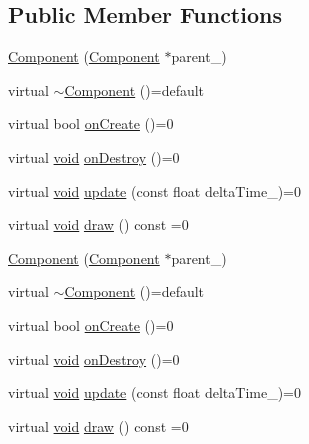 \subsection*{Public Member Functions}
\begin{DoxyCompactItemize}
\item 
\hyperlink{classComponent_ad8fd006e351b2722c2e0f79010170a3c}{Component} (\hyperlink{classComponent}{Component} $\ast$parent\+\_\+)
\item 
virtual \hyperlink{classComponent_ad82d7393e339c1b19cc17a0d55b5674d}{$\sim$\+Component} ()=default
\item 
virtual bool \hyperlink{classComponent_a3a1537a8b8bcdb2155afbb925c77b0a2}{on\+Create} ()=0
\item 
virtual \hyperlink{imgui__impl__opengl3__loader_8h_ac668e7cffd9e2e9cfee428b9b2f34fa7}{void} \hyperlink{classComponent_a2b198f27162a6caf63917e304295f892}{on\+Destroy} ()=0
\item 
virtual \hyperlink{imgui__impl__opengl3__loader_8h_ac668e7cffd9e2e9cfee428b9b2f34fa7}{void} \hyperlink{classComponent_a3448977e6f464df89e77dda7c6f52204}{update} (const float delta\+Time\+\_\+)=0
\item 
virtual \hyperlink{imgui__impl__opengl3__loader_8h_ac668e7cffd9e2e9cfee428b9b2f34fa7}{void} \hyperlink{classComponent_a8f45309003f02191f2bcc8864e8e9ecf}{draw} () const =0
\item 
\hyperlink{classComponent_ad8fd006e351b2722c2e0f79010170a3c}{Component} (\hyperlink{classComponent}{Component} $\ast$parent\+\_\+)
\item 
virtual \hyperlink{classComponent_ad82d7393e339c1b19cc17a0d55b5674d}{$\sim$\+Component} ()=default
\item 
virtual bool \hyperlink{classComponent_a3a1537a8b8bcdb2155afbb925c77b0a2}{on\+Create} ()=0
\item 
virtual \hyperlink{imgui__impl__opengl3__loader_8h_ac668e7cffd9e2e9cfee428b9b2f34fa7}{void} \hyperlink{classComponent_a2b198f27162a6caf63917e304295f892}{on\+Destroy} ()=0
\item 
virtual \hyperlink{imgui__impl__opengl3__loader_8h_ac668e7cffd9e2e9cfee428b9b2f34fa7}{void} \hyperlink{classComponent_a3448977e6f464df89e77dda7c6f52204}{update} (const float delta\+Time\+\_\+)=0
\item 
virtual \hyperlink{imgui__impl__opengl3__loader_8h_ac668e7cffd9e2e9cfee428b9b2f34fa7}{void} \hyperlink{classComponent_a8f45309003f02191f2bcc8864e8e9ecf}{draw} () const =0
\end{DoxyCompactItemize}
